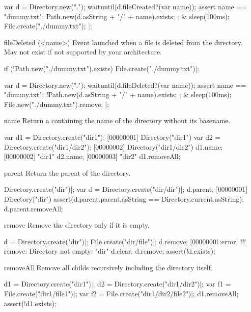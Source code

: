 \begin{urbiscriptapi}
\begin{urbiscript}[firstnumber=1]
  {
    var d = Directory.new(".");
    waituntil(d.fileCreated?(var name));
    assert
    {
      name == "dummy.txt";
      Path.new(d.asString + "/" + name).exists;
    };
  }
&
  {
    sleep(100ms);
    File.create("./dummy.txt");
  }|;
\end{urbiscript}

\item[fileDeleted](<name>)%
  Event launched when a file is deleted from the directory.  May not exist
  if not supported by your architecture.

\begin{urbiscript}
if (!Path.new("./dummy.txt").exists)
  File.create("./dummy.txt")|;

  {
    var d = Directory.new(".");
    waituntil(d.fileDeleted?(var name));
    assert
    {
      name == "dummy.txt";
      !Path.new(d.asString + "/" + name).exists;
    };
  }
&
  {
    sleep(100ms);
    File.new("./dummy.txt").remove;
  }|;
\end{urbiscript}

\item[name]
  Return a  containing the name of the directory without
  its basename.
\begin{urbiscript}
var d1 = Directory.create("dir1");
[00000001] Directory("dir1")
var d2 = Directory.create("dir1/dir2");
[00000002] Directory("dir1/dir2")
d1.name;
[00000002] "dir1"
d2.name;
[00000003] "dir2"
d1.removeAll;
\end{urbiscript}

\item[parent]
  Return the parent of the directory.
\begin{urbiscript}
Directory.create("dir")|;
var d = Directory.create("dir/dir")|;
d.parent;
[00000001] Directory("dir")
assert(d.parent.parent.asString == Directory.current.asString);
d.parent.removeAll;
\end{urbiscript}

\item[remove]
  Remove the directory only if it is empty.
\begin{urbiscript}
d = Directory.create("dir")|;
File.create("dir/file")|;
d.remove;
[00000001:error] !!! remove: Directory not empty: "dir"
d.clear;
d.remove;
assert(!d.exists);
\end{urbiscript}

\item[removeAll]
  Remove all childs recursively including the directory itself.
\begin{urbiscript}
d1 = Directory.create("dir1")|;
d2 = Directory.create("dir1/dir2")|;
var f1 = File.create("dir1/file1")|;
var f2 = File.create("dir1/dir2/file2")|;
d1.removeAll;
assert(!d1.exists);
\end{urbiscript}


\end{urbiscriptapi}
